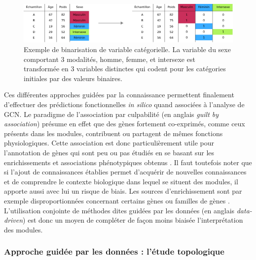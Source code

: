 \begin{figure}[ht]
    \centering
    \includegraphics[width=\textwidth]{img/intro/3_coexpr/intro_3_coexpr_binarisation.pdf}
    \caption[Exemple de binarisation de variable catégorielle]{Exemple de binarisation de variable catégorielle. La variable du sexe comportant 3 modalités, homme, femme, et intersexe est transformée en 3 variables distinctes qui codent pour les catégories initiales par des valeurs binaires.}
    \label{fig:binarisation}
\end{figure}

Ces différentes approches guidées par la connaissance permettent finalement d'effectuer des prédictions fonctionnelles \textit{in silico} quand associées à l'analyse de \acrshort{GCN}. Le paradigme de l'association par culpabilité (en anglais \textit{guilt by association}) présume en effet que des gènes fortement co-exprimés, comme ceux présents dans les modules, contribuent ou partagent de mêmes fonctions physiologiques\cite{Ballouz2015}. Cette association est donc particulièrement utile pour l'annotation de gènes qui sont peu ou pas étudiés en se basant sur les enrichissements et associations phénotypiques obtenus \cite{Wolfe2005}. Il faut toutefois noter que si l'ajout de connaissances établies permet d'acquérir de nouvelles connaissances et de comprendre le contexte biologique dans lequel se situent des modules, il apporte aussi avec lui un risque de biais. Les sources d'enrichissement sont par exemple disproportionnées concernant certains gènes ou familles de gènes \cite{Timmons2015Dec}. L'utilisation conjointe de méthodes dites guidées par les données (en anglais \textit{data-driven}) est donc un moyen de compléter de façon moins biaisée l'interprétation des modules.


\subsubsection{Approche guidée par les données : l'étude topologique}

